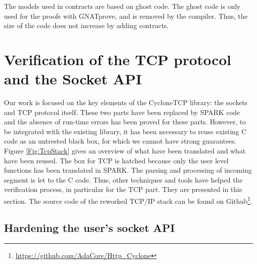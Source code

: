 \documentclass[runningheads]{llncs}
\begin{document}
    The models used in contracts are based on ghost code. The ghost code is only
    used for the proofs with GNATprove, and is removed by the compiler. Thus, the size
    of the code does not increase by adding contracts.



\section{Verification of the TCP protocol and the Socket API}
\label{sec:verif}

    Our work is focused on the key elements of the CycloneTCP library: the sockets and TCP protocol itself.
    These two parts have been replaced by SPARK code and the absence of run-time errors has been proved for
    these parts.
    However, to be integrated with the existing library, it has been necessary to reuse existing C code
    as an untrested black box, for which we cannot have strong guarantees. Figure \ref{Fig:TcpStack} gives an overview of
    what have been translated and what have been reused. The box for TCP is hatched because only the user level functions
    has been translated in SPARK. The parsing and processing of incoming segment is let to the C code.
    Thus, other techniques and tools have helped the verification process, in particular for the TCP part. They are presented in this section.
    The source code of the reworked TCP/IP stack can be found on Github\footnote{\url{https://github.com/AdaCore/Http_Cyclone}}.

\subsection{Hardening the user's socket API}
\end{document}
